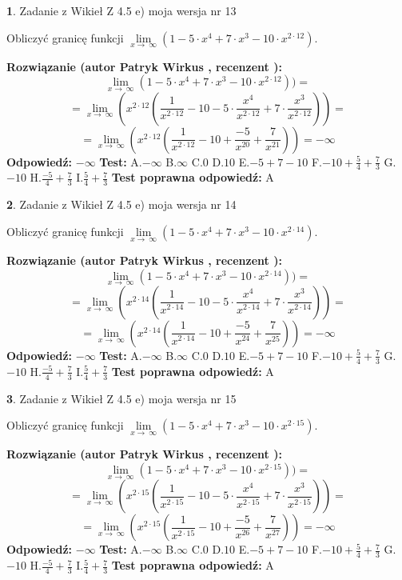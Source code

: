 \documentclass[12pt, a4paper]{article}
\theoremstyle{definition} %
\newtheorem{zad}{}
\newcommand{\zadStart}[1]{\begin{zad}#1\newline}
\newcommand{\zadStop}{\end{zad}}
\newcommand{\rozwStart}[2]{\noindent \textbf{Rozwiązanie (autor #1 , recenzent #2): }\newline}
\newcommand{\rozwStop}{\newline}
\newcommand{\odpStart}{\noindent \textbf{Odpowiedź:}\newline}
\newcommand{\odpStop}{\newline}
\newcommand{\testStart}{\noindent \textbf{Test:}\newline}
\newcommand{\testStop}{\newline}
\newcommand{\kluczStart}{\noindent \textbf{Test poprawna odpowiedź:}\newline}
\newcommand{\kluczStop}{\newline}
\begin{document}
\zadStart{Zadanie z Wikieł Z 4.5 e) moja wersja nr 13}



Obliczyć granicę funkcji  $\lim\limits_{x\to\ \infty}(1 - 5 \cdot x^{4}+7 \cdot x^{3}- 10 \cdot x^{2\cdot12})$.
\zadStop
\rozwStart{Patryk Wirkus}{}
$$\lim\limits_{x\to\ \infty}(1 - 5 \cdot x^{4}+7 \cdot x^{3}- 10 \cdot x^{2\cdot12}))=$$
$$=\lim\limits_{x\to\ \infty}(x^{2\cdot12}(\frac{1}{x^{2\cdot12}}-10 -5 \cdot \frac{x^{4}}{x^{2\cdot12}}+7 \cdot \frac{x^{3}}{x^{2\cdot12}}))=$$
$$=\lim\limits_{x\to\ \infty}(x^{2\cdot12}(\frac{1}{x^{2\cdot12}}-10 + \frac{-5}{x^{20}}+ \frac{7}{x^{21}}))=-\infty$$
\rozwStop
\odpStart
$-\infty$
\odpStop
\testStart
A.$-\infty$ B.$\infty$ C.$0$ D.$10$ E.$-5 + 7 - 10$
F.$-10+\frac{5}{4}+\frac{7}{3}$ G.$-10$
H.$\frac{-5}{4}+\frac{7}{3}$
I.$\frac{5}{4}+\frac{7}{3}$
\testStop
\kluczStart
A
\kluczStop



\zadStart{Zadanie z Wikieł Z 4.5 e) moja wersja nr 14}



Obliczyć granicę funkcji  $\lim\limits_{x\to\ \infty}(1 - 5 \cdot x^{4}+7 \cdot x^{3}- 10 \cdot x^{2\cdot14})$.
\zadStop
\rozwStart{Patryk Wirkus}{}
$$\lim\limits_{x\to\ \infty}(1 - 5 \cdot x^{4}+7 \cdot x^{3}- 10 \cdot x^{2\cdot14}))=$$
$$=\lim\limits_{x\to\ \infty}(x^{2\cdot14}(\frac{1}{x^{2\cdot14}}-10 -5 \cdot \frac{x^{4}}{x^{2\cdot14}}+7 \cdot \frac{x^{3}}{x^{2\cdot14}}))=$$
$$=\lim\limits_{x\to\ \infty}(x^{2\cdot14}(\frac{1}{x^{2\cdot14}}-10 + \frac{-5}{x^{24}}+ \frac{7}{x^{25}}))=-\infty$$
\rozwStop
\odpStart
$-\infty$
\odpStop
\testStart
A.$-\infty$ B.$\infty$ C.$0$ D.$10$ E.$-5 + 7 - 10$
F.$-10+\frac{5}{4}+\frac{7}{3}$ G.$-10$
H.$\frac{-5}{4}+\frac{7}{3}$
I.$\frac{5}{4}+\frac{7}{3}$
\testStop
\kluczStart
A
\kluczStop



\zadStart{Zadanie z Wikieł Z 4.5 e) moja wersja nr 15}



Obliczyć granicę funkcji  $\lim\limits_{x\to\ \infty}(1 - 5 \cdot x^{4}+7 \cdot x^{3}- 10 \cdot x^{2\cdot15})$.
\zadStop
\rozwStart{Patryk Wirkus}{}
$$\lim\limits_{x\to\ \infty}(1 - 5 \cdot x^{4}+7 \cdot x^{3}- 10 \cdot x^{2\cdot15}))=$$
$$=\lim\limits_{x\to\ \infty}(x^{2\cdot15}(\frac{1}{x^{2\cdot15}}-10 -5 \cdot \frac{x^{4}}{x^{2\cdot15}}+7 \cdot \frac{x^{3}}{x^{2\cdot15}}))=$$
$$=\lim\limits_{x\to\ \infty}(x^{2\cdot15}(\frac{1}{x^{2\cdot15}}-10 + \frac{-5}{x^{26}}+ \frac{7}{x^{27}}))=-\infty$$
\rozwStop
\odpStart
$-\infty$
\odpStop
\testStart
A.$-\infty$ B.$\infty$ C.$0$ D.$10$ E.$-5 + 7 - 10$
F.$-10+\frac{5}{4}+\frac{7}{3}$ G.$-10$
H.$\frac{-5}{4}+\frac{7}{3}$
I.$\frac{5}{4}+\frac{7}{3}$
\testStop
\kluczStart
A
\kluczStop
\end{document}
